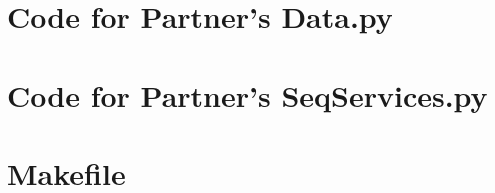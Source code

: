 \documentclass[12pt]{article}
\begin{document}
\newpage

\section{Code for Partner's Data.py}

\noindent 


\newpage

\section{Code for Partner's SeqServices.py}

\noindent 


\newpage

\section{Makefile}

\lstset{language=make}
\noindent 
\end{document}
